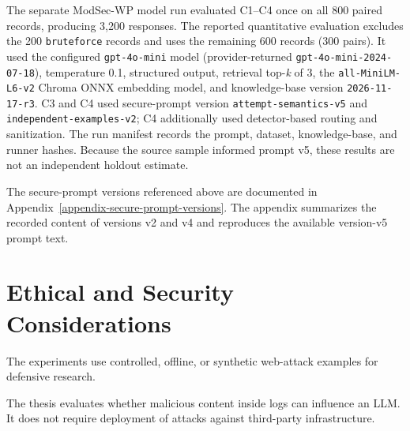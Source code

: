 The separate ModSec-WP model run evaluated C1--C4 once on all 800 paired
records, producing 3{,}200 responses. The reported quantitative
evaluation excludes the 200 \texttt{bruteforce} records and uses the
remaining 600 records (300 pairs). It used the configured
\texttt{gpt-4o-mini} model (provider-returned
\texttt{gpt-4o-mini-2024-07-18}), temperature 0.1, structured output,
retrieval top-\emph{k} of 3, the \texttt{all-MiniLM-L6-v2} Chroma ONNX
embedding model, and knowledge-base version \texttt{2026-11-17-r3}. C3
and C4 used
secure-prompt version \texttt{attempt-semantics-v5} and
\texttt{independent-examples-v2}; C4 additionally used detector-based
routing and sanitization. The run manifest records the prompt, dataset,
knowledge-base, and runner hashes. Because the source sample informed
prompt v5, these results are not an independent holdout estimate.

The secure-prompt versions referenced above are documented in
Appendix~\ref{appendix-secure-prompt-versions}. The appendix summarizes
the recorded content of versions v2 and v4 and reproduces the available
version-v5 prompt text.

\section{Ethical and Security
Considerations}\label{ethical-and-security-considerations}

The experiments use controlled, offline, or synthetic web-attack
examples for defensive research.

The thesis evaluates whether malicious content inside logs can influence
an LLM. It does not require deployment of attacks against third-party
infrastructure.
